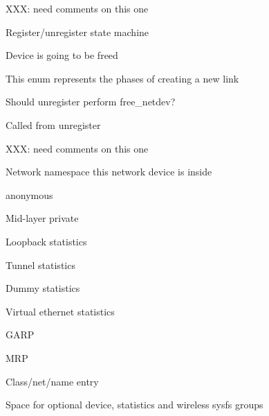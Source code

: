 \documentclass[a4paper,8pt,english]{sphinxmanual}
\begin{document}
\begin{description}
\item[{}] \leavevmode
XXX: need comments on this one

\item[{}] \leavevmode
Register/unregister state machine

\item[{}] \leavevmode
Device is going to be freed

\item[{}] \leavevmode
This enum represents the phases of creating
a new link

\item[{}] \leavevmode
Should unregister perform free\_netdev?

\item[{}] \leavevmode
Called from unregister

\item[{}] \leavevmode
XXX: need comments on this one

\item[{}] \leavevmode
Network namespace this network device is inside

\item[{}] \leavevmode
anonymous

\item[{}] \leavevmode
Mid-layer private

\item[{}] \leavevmode
Loopback statistics

\item[{}] \leavevmode
Tunnel statistics

\item[{}] \leavevmode
Dummy statistics

\item[{}] \leavevmode
Virtual ethernet statistics

\item[{}] \leavevmode
GARP

\item[{}] \leavevmode
MRP

\item[{}] \leavevmode
Class/net/name entry

\item[{}] \leavevmode
Space for optional device, statistics and wireless
sysfs groups


\end{description}
\end{document}
